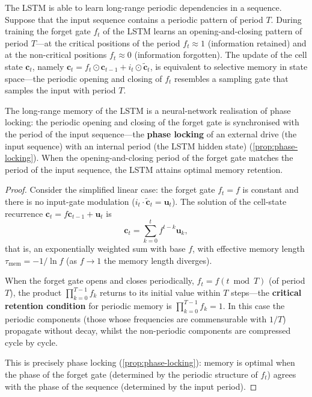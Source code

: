 \begin{proposition}\label{prop:lstm_long_range}
The LSTM is able to learn long-range periodic dependencies in a sequence. Suppose that the input sequence contains a periodic pattern of period $T$. During training the forget gate $f_t$ of the LSTM learns an opening-and-closing pattern of period $T$---at the critical positions of the period $f_t \approx 1$ (information retained) and at the non-critical positions $f_t \approx 0$ (information forgotten). The update of the cell state $\mathbf{c}_t$, namely $\mathbf{c}_t = f_t \odot \mathbf{c}_{t-1} + i_t \odot \tilde{\mathbf{c}}_t$, is equivalent to selective memory in state space---the periodic opening and closing of $f_t$ resembles a sampling gate that samples the input with period $T$.

The long-range memory of the LSTM is a neural-network realisation of phase locking: the periodic opening and closing of the forget gate is synchronised with the period of the input sequence---the \textbf{phase locking} of an external drive (the input sequence) with an internal period (the LSTM hidden state) (\cref{prop:phase-locking}). When the opening-and-closing period of the forget gate matches the period of the input sequence, the LSTM attains optimal memory retention.
\end{proposition}

\begin{proof}
Consider the simplified linear case: the forget gate $f_t = f$ is constant and there is no input-gate modulation ($i_t \cdot \tilde{\mathbf{c}}_t = \mathbf{u}_t$). The solution of the cell-state recurrence $\mathbf{c}_t = f \mathbf{c}_{t-1} + \mathbf{u}_t$ is
\[
\mathbf{c}_t = \sum_{k=0}^{t} f^{t-k} \mathbf{u}_k,
\]
that is, an exponentially weighted sum with base $f$, with effective memory length $\tau_{\text{mem}} = -1/\ln f$ (as $f \to 1$ the memory length diverges).

When the forget gate opens and closes periodically, $f_t = f(t \bmod T)$ (of period $T$), the product $\prod_{k=0}^{T-1} f_k$ returns to its initial value within $T$ steps---the \textbf{critical retention condition} for periodic memory is $\prod_{k=0}^{T-1} f_k = 1$. In this case the periodic components (those whose frequencies are commensurable with $1/T$) propagate without decay, whilst the non-periodic components are compressed cycle by cycle.

This is precisely phase locking (\cref{prop:phase-locking}): memory is optimal when the phase of the forget gate (determined by the periodic structure of $f_t$) agrees with the phase of the sequence (determined by the input period).
\end{proof}

